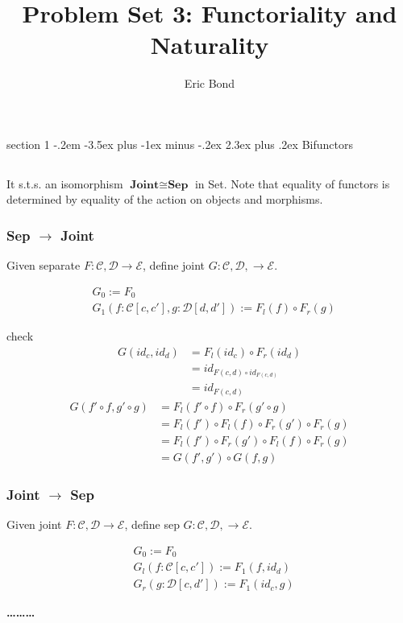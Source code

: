 \documentclass[12pt]{article}
\makeatletter
\theoremstyle{definition}
\newenvironment{problem}{\@startsection
       {section}
       {1}
       {-.2em}
       {-3.5ex plus -1ex minus -.2ex}
       {2.3ex plus .2ex}
       {\pagebreak[3]%
       \large\bf\noindent{Problem }
       }
       }
       {%
       \begin{center}\large\bf \ldots\ldots\ldots\end{center}}
\newcommand{\cat}{\mathcal}
\makeatother
\begin{document}
\title{Problem Set 3: Functoriality and Naturality}

\author{Eric Bond}
\maketitle


\begin{problem}{Bifunctors}

    \subsection{}
    It s.t.s. an isomorphism $\textbf{Joint} \cong \textbf{Sep}$ in Set. Note that equality of functors is determined by equality of the action on objects and morphisms.
    \subsubsection*{Sep $\to$ Joint}
    Given separate $F : \cat C,\cat D \to \cat E$, define joint $G : \cat C, \cat D, \to \cat E$.
    
    \begin{align*}
        &G_0 := F_0 \\
        &G_1 (f : \cat C[c,c'],g : \cat D[d,d']) := F_l(f) \circ F_r(g)
    \end{align*}

    check
    \begin{align*}
        G(id_c,id_d) &= F_l(id_c) \circ F_r(id_d)\\
        &= id_{F(c,d) \circ id_{F(c,d)}}\\
        &= id_{F(c,d)}
    \end{align*}
    \begin{align*}
        G(f' \circ f,g' \circ g) &= F_l(f' \circ f) \circ F_r (g' \circ g)\\
        &=F_l(f') \circ F_l(f) \circ F_r(g') \circ F_r(g) \\
        &=F_l(f') \circ F_r(g') \circ F_l(f) \circ F_r(g) \\
        &=G(f',g') \circ G(f,g)
    \end{align*}


    \subsubsection*{Joint $\to$ Sep}
Given joint $F : \cat C,\cat D \to \cat E$, define sep $G : \cat C, \cat D, \to \cat E$.

    \begin{align*}
        &G_0 := F_0 \\
        &G_l (f : \cat C[c,c']) := F_1(f,id_d)\\
        &G_r (g : \cat D[c,d']) := F_1(id_c,g)
    \end{align*}


\end{problem}
\end{document}
